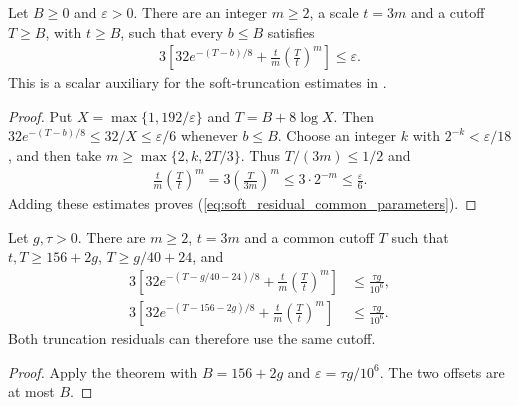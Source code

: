 \begin{theorem}
    \label{thm:soft_residual_parameter_existence}
    \leanok
    Let $B\ge0$ and $\varepsilon>0$. There are an integer $m\ge2$,
    a scale $t=3m$ and a cutoff $T\ge B$, with $t\ge B$, such that
    every $b\le B$ satisfies
    \begin{align}
        3\left[32e^{-(T-b)/8}
             +\frac{t}{m}\left(\frac{T}{t}\right)^m\right]
        \le\varepsilon.
        \label{eq:soft_residual_common_parameters}
    \end{align}
    This is a scalar auxiliary for the soft-truncation estimates in
    \cite[lines 1195--1255 and 1373--1420]{Arad2016RigorousRG}.
\end{theorem}
\begin{proof}\leanok
    Put $X=\max\{1,192/\varepsilon\}$ and $T=B+8\log X$.
    Then $32e^{-(T-b)/8}\le32/X\le\varepsilon/6$ whenever $b\le B$.
    Choose an integer $k$ with $2^{-k}<\varepsilon/18$, and then take
    $m\ge\max\{2,k,2T/3\}$. Thus $T/(3m)\le1/2$ and
    \begin{align}
        \frac{t}{m}\left(\frac{T}{t}\right)^m
        =3\left(\frac{T}{3m}\right)^m
        \le3\cdot2^{-m}\le\frac{\varepsilon}{6}.
    \end{align}
    Adding these estimates proves
    (\ref{eq:soft_residual_common_parameters}).
\end{proof}

\begin{corollary}
    \label{cor:soft_cluster_parameter_existence}
    \leanok
    Let $g,\tau>0$. There are $m\ge2$, $t=3m$ and a common cutoff $T$
    such that $t,T\ge156+2g$, $T\ge g/40+24$, and
    \begin{align}
        3\left[32e^{-(T-g/40-24)/8}
             +\frac{t}{m}\left(\frac{T}{t}\right)^m\right]
         & \le\frac{\tau g}{10^6}, \\
        3\left[32e^{-(T-156-2g)/8}
             +\frac{t}{m}\left(\frac{T}{t}\right)^m\right]
         & \le\frac{\tau g}{10^6}.
    \end{align}
    Both truncation residuals can therefore use the same cutoff.
\end{corollary}
\begin{proof}\leanok
    Apply the theorem with $B=156+2g$ and
    $\varepsilon=\tau g/10^6$. The two offsets are at most $B$.
\end{proof}

